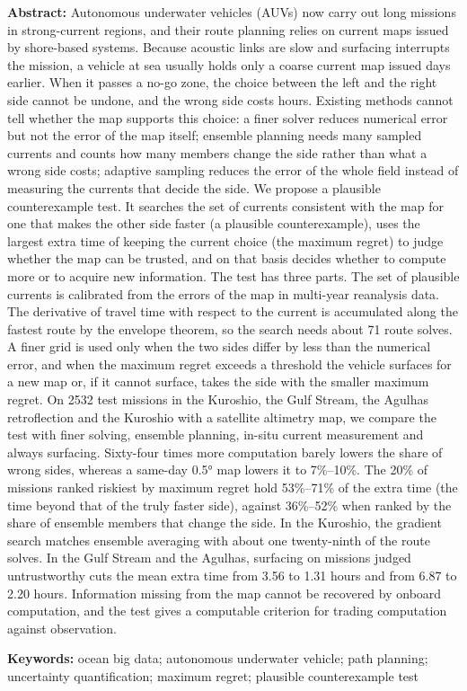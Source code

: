 {\bfseries Abstract:}
Autonomous underwater vehicles (AUVs) now carry out long missions in strong-current regions, and their route planning relies on current maps issued by shore-based systems. Because acoustic links are slow and surfacing interrupts the mission, a vehicle at sea usually holds only a coarse current map issued days earlier. When it passes a no-go zone, the choice between the left and the right side cannot be undone, and the wrong side costs hours. Existing methods cannot tell whether the map supports this choice: a finer solver reduces numerical error but not the error of the map itself; ensemble planning needs many sampled currents and counts how many members change the side rather than what a wrong side costs; adaptive sampling reduces the error of the whole field instead of measuring the currents that decide the side. We propose a plausible counterexample test. It searches the set of currents consistent with the map for one that makes the other side faster (a plausible counterexample), uses the largest extra time of keeping the current choice (the maximum regret) to judge whether the map can be trusted, and on that basis decides whether to compute more or to acquire new information. The test has three parts. The set of plausible currents is calibrated from the errors of the map in multi-year reanalysis data. The derivative of travel time with respect to the current is accumulated along the fastest route by the envelope theorem, so the search needs about 71 route solves. A finer grid is used only when the two sides differ by less than the numerical error, and when the maximum regret exceeds a threshold the vehicle surfaces for a new map or, if it cannot surface, takes the side with the smaller maximum regret. On 2532 test missions in the Kuroshio, the Gulf Stream, the Agulhas retroflection and the Kuroshio with a satellite altimetry map, we compare the test with finer solving, ensemble planning, in-situ current measurement and always surfacing. Sixty-four times more computation barely lowers the share of wrong sides, whereas a same-day 0.5° map lowers it to 7\%--10\%. The 20\% of missions ranked riskiest by maximum regret hold 53\%--71\% of the extra time (the time beyond that of the truly faster side), against 36\%--52\% when ranked by the share of ensemble members that change the side. In the Kuroshio, the gradient search matches ensemble averaging with about one twenty-ninth of the route solves. In the Gulf Stream and the Agulhas, surfacing on missions judged untrustworthy cuts the mean extra time from 3.56 to 1.31 hours and from 6.87 to 2.20 hours. Information missing from the map cannot be recovered by onboard computation, and the test gives a computable criterion for trading computation against observation.

{\bfseries Keywords:} ocean big data; autonomous underwater vehicle; path planning; uncertainty quantification; maximum regret; plausible counterexample test
